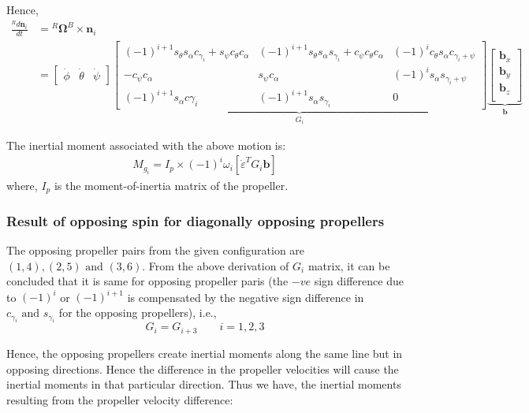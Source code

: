 Hence,
\begin{align*}
    \frac{{}^R d\pmb n_i}{dt} &= {}^R \pmb \Omega^B \times \pmb n_i\\
    &= \begin{bmatrix}
        \dot \phi & \dot \theta & \dot \psi
    \end{bmatrix}
    \underbrace{\begin{bmatrix}
        (-1)^{i+1} s_{\theta} s_{\alpha} c_{\gamma_i} + s_{\psi} c_{\theta} c_{\alpha}
        & (-1)^{i+1} s_{\theta} s_{\alpha} s_{\gamma_i} + c_{\psi} c_{\theta} c_{\alpha}
        & (-1)^{i} c_{\theta}s_{\alpha} c_{\gamma_i + \psi}
        \\
        -c_{\psi} c_{\alpha}
        & s_{\psi} c_{\alpha}
        & (-1)^{i} s_{\alpha} s_{\gamma_i + \psi}
        \\
        (-1)^{i+1} s_{\alpha} c{\gamma_i}
        & (-1)^{i+1} s_{\alpha} s_{\gamma_i}
        & 0
    \end{bmatrix}}_{G_i}
    \underbrace{\begin{bmatrix}
    \pmb b_x \\ \pmb b_y \\ \pmb b_z\\
    \end{bmatrix}}_{\pmb b}
\end{align*}


The inertial moment associated with the above motion is:
\begin{align*}
    M_{g_i} =  I_p \times (-1)^{i} \omega_i \left[\dot \varepsilon^T  G_i \pmb b \right]
\end{align*}
where, $I_p$ is the moment-of-inertia matrix of the propeller.

\subsubsection{Result of opposing spin for diagonally opposing propellers}

The opposing propeller pairs from the given configuration are $(1, 4), (2, 5) \text{ and } (3, 6)$. From the above derivation of $G_i$ matrix, it can be concluded that it is same for opposing propeller paris (the $-ve$ sign difference due to $(-1)^i$ or $(-1)^{i+1}$ is compensated by the negative sign difference in $c_{\gamma_i} \text{ and } s_{\gamma_i}$ for the opposing propellers), i.e.,
$$ G_{i} = G_{i+3} \qquad i = 1, 2, 3$$

Hence, the opposing propellers create inertial moments along the same line but in opposing directions. Hence the difference in the propeller velocities will cause the inertial moments in that particular direction. Thus we have, the inertial moments resulting from the propeller velocity difference:


